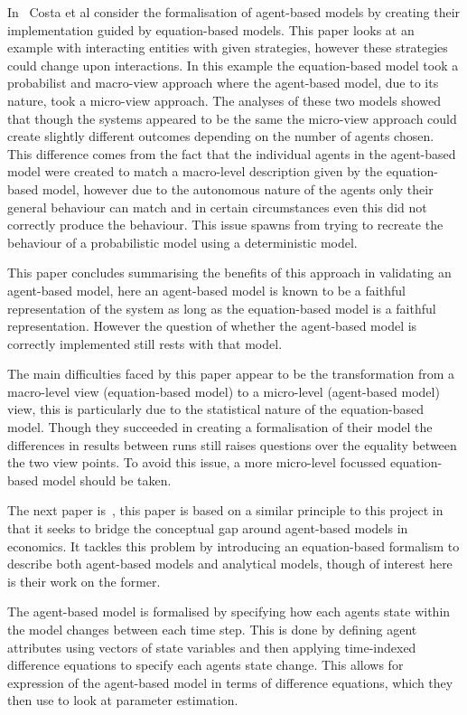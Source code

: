 \documentclass{article}
\begin{document}
In~\cite{ebmabmi} Costa et al consider the formalisation of agent-based models by creating their implementation guided by equation-based models. This paper looks at an example with interacting entities with given strategies, however these strategies could change upon interactions. In this example the equation-based model took a probabilist and macro-view approach where the agent-based model, due to its nature, took a micro-view approach. The analyses of these two models showed that though the systems appeared to be the same the micro-view approach could create slightly different outcomes depending on the number of agents chosen. This difference comes from the fact that the individual agents in the agent-based model were created to match a macro-level description given by the equation-based model, however due to the autonomous nature of the agents only their general behaviour can match and in certain circumstances even this did not correctly produce the behaviour. This issue spawns from trying  to recreate the behaviour of a probabilistic model using a deterministic model. 

This paper concludes summarising the benefits of this approach in validating an agent-based model, here an agent-based model is known to be a faithful representation of the system as long as the equation-based model is a faithful representation. However the question of whether the agent-based model is correctly implemented still rests with that model. 

The main difficulties faced by this paper appear to be the transformation from a macro-level view (equation-based model) to a micro-level (agent-based model) view, this is particularly due to the statistical nature of the equation-based model. Though they succeeded in creating a formalisation of their model the differences in results between runs still raises questions over the equality between the two view points. To avoid this issue, a more micro-level focussed equation-based model should be taken.

The next paper is~\cite{econmistsnoabm}, this paper is based on a similar principle to this project in that it seeks to bridge the conceptual gap around  agent-based models in economics. It tackles this problem by introducing an equation-based formalism to describe both agent-based models and analytical models, though of interest here is their work on the former. 

The agent-based model is formalised by specifying how each agent\textsc{}s state within the model changes between each time step. This is done by defining agent attributes using vectors of state variables and then applying time-indexed difference equations to specify each agents state change. This allows for expression of the agent-based model in terms of difference equations, which they then use to look at parameter estimation. 
\end{document}
